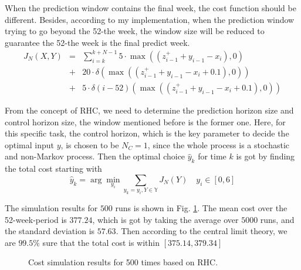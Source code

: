 \documentclass[letterpaper, 10 pt, conference]{ieeeconf}
\begin{document}
When the prediction window contains the final week, the cost function should be different. Besides, according to my implementation, when the prediction window trying to go beyond the 52-the week, the window size will be reduced to guarantee the 52-the week is the final predict week.
\begin{equation}
  \begin{array}{rcl}
    J_N(X,Y) &=& \sum \limits_{i = k}^{k+N-1} 5\cdot \max\left(\left(z_{i-1}^+
    + y_{i-1}-x_i\right),0\right) \\
    &+& 20\cdot \delta\left(\max\left(\left(z_{i-1}^+ + y_{i-1}-x_i +0.1\right),0\right)\right) \\
    &+& 5\cdot \delta\left(i-52\right)\left(\max\left(\left(z_{i-1}^+ + y_{i-1}-x_i+0.1\right),0\right)\right)
  \end{array}
\end{equation}

From the concept of RHC, we need to determine the prediction horizon size and control horizon size, the window mentioned before is the former one. Here, for this specific task, the control horizon, which is the key parameter to decide the optimal input $y$, is chosen to be $N_C = 1$, since the whole process is a stochastic and non-Markov process. Then the optimal choice $\hat{y}_k$ for time $k$ is got by finding the total cost starting with
\begin{equation}
\hat{y}_k = \arg \min \limits_{y_i} \sum \limits_{y_k=y_i, Y \in \mathbb{Y}} J_N(Y) \quad y_i \in [0,6]
\end{equation}

The simulation results for $500$ runs is shown in Fig. \ref{ADS_4_Simu}. The mean cost over the 52-week-period is $377.24$, which is got by taking the average over $5000$ runs, and the standard deviation is $57.63$. Then according to the central limit theory, we are  $99.5\%$ sure that the total cost is within $[375.14, 379.34]$
\begin{figure}[thpb]
   \centering
   \caption{Cost simulation results for 500 times based on RHC.}
   \label{ADS_4_Simu}
\end{figure}
\end{document}
